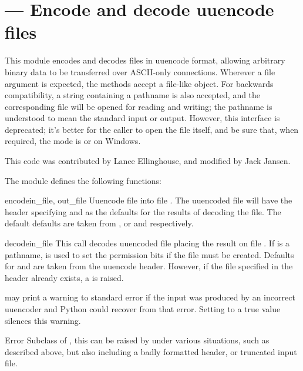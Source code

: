 \section{ ---
         Encode and decode uuencode files}



This module encodes and decodes files in uuencode format, allowing
arbitrary binary data to be transferred over ASCII-only connections.
Wherever a file argument is expected, the methods accept a file-like
object.  For backwards compatibility, a string containing a pathname
is also accepted, and the corresponding file will be opened for
reading and writing; the pathname  is understood to mean the
standard input or output.  However, this interface is deprecated; it's
better for the caller to open the file itself, and be sure that, when
required, the mode is  or  on Windows.

This code was contributed by Lance Ellinghouse, and modified by Jack
Jansen.

The  module defines the following functions:

\begin{funcdesc}{encode}{in_file, out_file}
  Uuencode file  into file .  The uuencoded
  file will have the header specifying  and  as
  the defaults for the results of decoding the file. The default
  defaults are taken from , or  and 
  respectively.
\end{funcdesc}

\begin{funcdesc}{decode}{in_file}
  This call decodes uuencoded file  placing the result on
  file . If  is a pathname,  is
  used to set the permission bits if the file must be
  created. Defaults for  and  are taken from
  the uuencode header.  However, if the file specified in the header
  already exists, a  is raised.

   may print a warning to standard error if the
  input was produced by an incorrect uuencoder and Python could
  recover from that error.  Setting  to a true value
  silences this warning.
\end{funcdesc}

\begin{excclassdesc}{Error}{}
  Subclass of , this can be raised by
   under various situations, such as described
  above, but also including a badly formatted header, or truncated
  input file.
\end{excclassdesc}

\begin{seealso}
\end{seealso}
